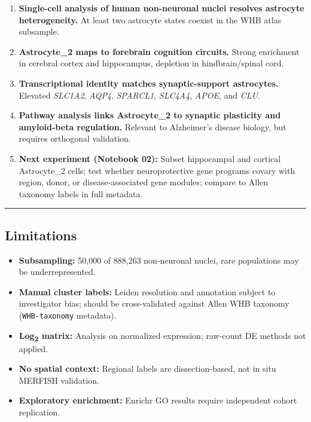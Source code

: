 \documentclass[
  11pt,
]{article}
\providecommand{\tightlist}{%
  \setlength{\itemsep}{0pt}\setlength{\parskip}{0pt}}
\begin{document}
\begin{enumerate}
\def\labelenumi{\arabic{enumi}.}
\item
  \textbf{Single-cell analysis of human non-neuronal nuclei resolves
  astrocyte heterogeneity.} At least two astrocyte states coexist in the
  WHB atlas subsample.
\item
  \textbf{Astrocyte\_2 maps to forebrain cognition circuits.} Strong
  enrichment in cerebral cortex and hippocampus, depletion in
  hindbrain/spinal cord.
\item
  \textbf{Transcriptional identity matches synaptic-support astrocytes.}
  Elevated \emph{SLC1A2}, \emph{AQP4}, \emph{SPARCL1}, \emph{SLC4A4},
  \emph{APOE}, and \emph{CLU}.
\item
  \textbf{Pathway analysis links Astrocyte\_2 to synaptic plasticity and
  amyloid-beta regulation.} Relevant to Alzheimer's disease biology, but
  requires orthogonal validation.
\item
  \textbf{Next experiment (Notebook 02):} Subset hippocampal and
  cortical Astrocyte\_2 cells; test whether neuroprotective gene
  programs covary with region, donor, or disease-associated gene
  modules; compare to Allen taxonomy labels in full metadata.
\end{enumerate}

\begin{center}\rule{0.5\linewidth}{0.5pt}\end{center}

\subsection{Limitations}\label{limitations}

\begin{itemize}
\tightlist
\item
  \textbf{Subsampling:} 50,000 of 888,263 non-neuronal nuclei, rare
  populations may be underrepresented.
\item
  \textbf{Manual cluster labels:} Leiden resolution and annotation
  subject to investigator bias; should be cross-validated against Allen
  WHB taxonomy (\texttt{WHB-taxonomy} metadata).
\item
  \textbf{Log\textsubscript{2} matrix:} Analysis on normalized
  expression; raw-count DE methods not applied.
\item
  \textbf{No spatial context:} Regional labels are dissection-based, not
  in situ MERFISH validation.
\item
  \textbf{Exploratory enrichment:} Enrichr GO results require
  independent cohort replication.
\end{itemize}
\end{document}
